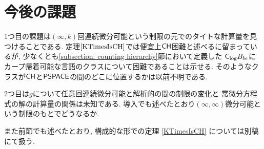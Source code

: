 \section{今後の課題}
1つ目の課題は$(\infty, k)$回連続微分可能という制限の元でのタイトな計算量を見つけることである.
定理$\ref{KTimesIsCH}$では便宜上$\mathsf{CH}$困難と述べるに留まっているが,
少なくとも\ref{subsection: counting hierarchy}節において定義した
$\mathsf{C}_{\log} B_{be}$にカープ帰着可能な言語のクラスについて困難であることは示せる.
そのようなクラスが$\mathsf{CH}$と$\mathsf{PSPACE}$の間のどこに位置するかは以前不明である.

2つ目は$g$について任意回連続微分可能と解析的の間の制限の変化と
常微分方程式の解の計算量の関係は未知である.
導入でも述べたとおり$(\infty, \infty)$微分可能という制限のもとでどうなるか.

また前節でも述べたとおり, 構成的な形での定理 \ref{KTimesIsCH} については別稿にて扱う.
